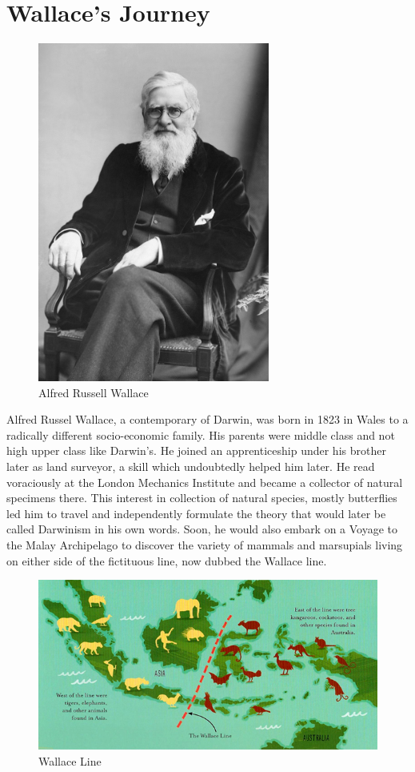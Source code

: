 \documentclass{article}
\begin{document}
\section{Wallace's Journey}
\begin{figure}[h]
    \centering
    \includegraphics[width = 3.0in]{Alfred-Russel-Wallace-c1895.jpg}
    \caption{Alfred Russell Wallace}
\end{figure}
\par 
Alfred Russel Wallace, a contemporary of Darwin, was born in 1823 in Wales to a radically different socio-economic family. His parents were middle class and not high upper class like Darwin’s. He joined an apprenticeship under his brother later as land surveyor, a skill which undoubtedly helped him later. He read voraciously at the London Mechanics Institute and became a collector of natural specimens there. This interest in collection of natural species, mostly butterflies led him to travel and independently formulate the theory that would later be called Darwinism in his own words. Soon, he would also embark on a Voyage to the Malay Archipelago to discover the variety of mammals and marsupials living on either side of the fictituous line, now dubbed the Wallace line. \\ 
\begin{figure}[h]
    \centering
    \includegraphics[width =5.0in]{wallaceline.jpg}
    \caption{Wallace Line}
\end{figure}
\end{document}
